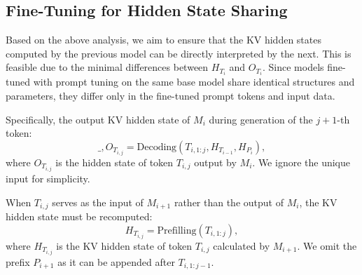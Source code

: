 

\subsection{Fine-Tuning for Hidden State Sharing}
\label{sec:fine-tuning}
Based on the above analysis, we aim to ensure that the KV hidden states computed by the previous model can be directly interpreted by the next. 
This is feasible due to the minimal differences between $H_{T_{i}}$ and $O_{T_{i}}$. Since models fine-tuned with prompt tuning on the same base model share identical structures and parameters, they differ only in the fine-tuned prompt tokens and input data.

Specifically, the output KV hidden state of $M_{i}$ during generation of the $j+1$-th token:
\begin{equation}
\_, O_{T_{i,j}} = \text{Decoding}(T_{i, 1:j}, H_{T_{i-1}}, H_{P_{i}}),
\label{eq:h_1}
\end{equation}
where $O_{T_{i,j}}$ is the hidden state of token $T_{i,j}$ output by $M_i$. We ignore the unique input for simplicity. 

When $T_{i,j}$ serves as the input of $M_{i+1}$ rather than the output of $M_{i}$, the KV hidden state must be recomputed:
\begin{equation}
H_{T_{i,j}} = \text{Prefilling}(T_{i, 1:j}),
\label{eq:h_2}
\end{equation}
where $H_{T_{i,j}}$ is the KV hidden state of token $T_{i,j}$ calculated by $M_{i+1}$. We omit the prefix $P_{i+1}$ as it can be appended after $T_{i,1:j-1}$.


